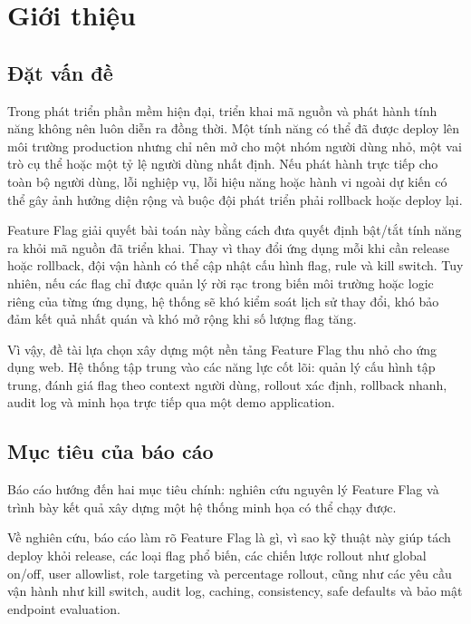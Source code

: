 \chapter{Giới thiệu} %

\section{Đặt vấn đề}

Trong phát triển phần mềm hiện đại, triển khai mã nguồn và phát hành tính năng không nên luôn diễn ra đồng thời. Một tính năng có thể đã được deploy lên môi trường production nhưng chỉ nên mở cho một nhóm người dùng nhỏ, một vai trò cụ thể hoặc một tỷ lệ người dùng nhất định. Nếu phát hành trực tiếp cho toàn bộ người dùng, lỗi nghiệp vụ, lỗi hiệu năng hoặc hành vi ngoài dự kiến có thể gây ảnh hưởng diện rộng và buộc đội phát triển phải rollback hoặc deploy lại.

Feature Flag giải quyết bài toán này bằng cách đưa quyết định bật/tắt tính năng ra khỏi mã nguồn đã triển khai. Thay vì thay đổi ứng dụng mỗi khi cần release hoặc rollback, đội vận hành có thể cập nhật cấu hình flag, rule và kill switch. Tuy nhiên, nếu các flag chỉ được quản lý rời rạc trong biến môi trường hoặc logic riêng của từng ứng dụng, hệ thống sẽ khó kiểm soát lịch sử thay đổi, khó bảo đảm kết quả nhất quán và khó mở rộng khi số lượng flag tăng.

Vì vậy, đề tài lựa chọn xây dựng một nền tảng Feature Flag thu nhỏ cho ứng dụng web. Hệ thống tập trung vào các năng lực cốt lõi: quản lý cấu hình tập trung, đánh giá flag theo context người dùng, rollout xác định, rollback nhanh, audit log và minh họa trực tiếp qua một demo application.

\section{Mục tiêu của báo cáo}

Báo cáo hướng đến hai mục tiêu chính: nghiên cứu nguyên lý Feature Flag và trình bày kết quả xây dựng một hệ thống minh họa có thể chạy được.

Về nghiên cứu, báo cáo làm rõ Feature Flag là gì, vì sao kỹ thuật này giúp tách deploy khỏi release, các loại flag phổ biến, các chiến lược rollout như global on/off, user allowlist, role targeting và percentage rollout, cũng như các yêu cầu vận hành như kill switch, audit log, caching, consistency, safe defaults và bảo mật endpoint evaluation.

